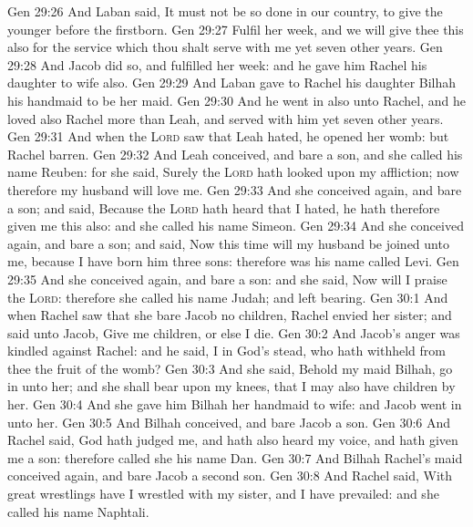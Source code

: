 \vs Gen 29:26 And Laban said, It must not be so done in our country, to give the younger before the firstborn.
\vs Gen 29:27 Fulfil her week, and we will give thee this also for the service which thou shalt serve with me yet seven other years.
\vs Gen 29:28 And Jacob did so, and fulfilled her week: and he gave him Rachel his daughter to wife also.
\vs Gen 29:29 And Laban gave to Rachel his daughter Bilhah his handmaid to be her maid.
\vs Gen 29:30 And he went in also unto Rachel, and he loved also Rachel more than Leah, and served with him yet seven other years.
\vs Gen 29:31 And when the \textsc{Lord} saw that Leah  hated, he opened her womb: but Rachel  barren.
\vs Gen 29:32 And Leah conceived, and bare a son, and she called his name Reuben: for she said, Surely the \textsc{Lord} hath looked upon my affliction; now therefore my husband will love me.
\vs Gen 29:33 And she conceived again, and bare a son; and said, Because the \textsc{Lord} hath heard that I  hated, he hath therefore given me this  also: and she called his name Simeon.
\vs Gen 29:34 And she conceived again, and bare a son; and said, Now this time will my husband be joined unto me, because I have born him three sons: therefore was his name called Levi.
\vs Gen 29:35 And she conceived again, and bare a son: and she said, Now will I praise the \textsc{Lord}: therefore she called his name Judah; and left bearing.
\vs Gen 30:1 And when Rachel saw that she bare Jacob no children, Rachel envied her sister; and said unto Jacob, Give me children, or else I die.
\vs Gen 30:2 And Jacob's anger was kindled against Rachel: and he said,  I in God's stead, who hath withheld from thee the fruit of the womb?
\vs Gen 30:3 And she said, Behold my maid Bilhah, go in unto her; and she shall bear upon my knees, that I may also have children by her.
\vs Gen 30:4 And she gave him Bilhah her handmaid to wife: and Jacob went in unto her.
\vs Gen 30:5 And Bilhah conceived, and bare Jacob a son.
\vs Gen 30:6 And Rachel said, God hath judged me, and hath also heard my voice, and hath given me a son: therefore called she his name Dan.
\vs Gen 30:7 And Bilhah Rachel's maid conceived again, and bare Jacob a second son.
\vs Gen 30:8 And Rachel said, With great wrestlings have I wrestled with my sister, and I have prevailed: and she called his name Naphtali.

